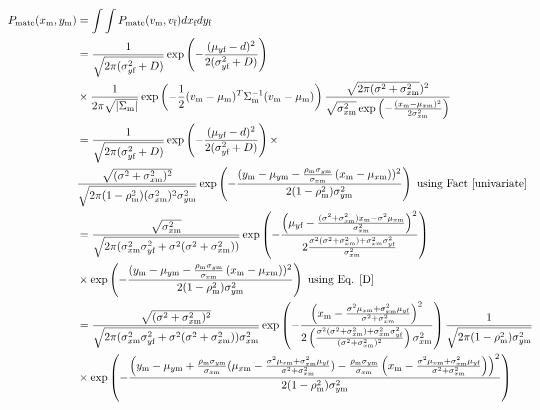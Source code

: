 \documentclass{article}
\newcommand{\x}[1]{\text{#1}}
\begin{document}
\begin{pf}
\begin{enumerate}
\begin{align*}
\hspace{-20pt}P_\text{mate}(x_\x{m},y_\x{m})&=\int\int P_\text{mate}(v_\x{m},v_\x{f})dx_\x{f}dy_\x{f}
\\&=\frac{1}{\sqrt{2\pi(\sigma_{y\x{f}}^2+D)}}\exp\left(-\frac{(\mu_{y\x{f}}-d)^2}{2(\sigma_{y\x{f}}^2+D)}\right) 
\\&\times \frac{1}{2\pi\sqrt{|\Sigma_\x{m}|}}\exp\left(-\frac{1}{2}(v_\x{m}-\mu_\x{m})^T\Sigma_\x{m}^{-1}(v_\x{m}-\mu_\x{m})\right)\frac{\sqrt{2\pi(\sigma^2+\sigma_{x\x{m}}^2})^2}{\sqrt{\sigma_{x\x{m}}^2}\exp\left(-\frac{(x_\x{m}-\mu_{x\x{m}})^2}{2\sigma_{x\x{m}}^2}\right)}
\\&=\frac{1}{\sqrt{2\pi(\sigma_{y\x{f}}^2+D)}}\exp\left(-\frac{(\mu_{y\x{f}}-d)^2}{2(\sigma_{y\x{f}}^2+D)}\right)\times
\\ &\frac{\sqrt{(\sigma^2+\sigma_{x\x{m}}^2)^2}}{\sqrt{2\pi (1-\rho_\x{m}^2)(\sigma_{x\x{m}}^2)^2\sigma_{y\x{m}}^2}}\exp\left(-\frac{(y_\x{m}-\mu_{y\x{m}}-\frac{\rho_\x{m}\sigma_{y\x{m}}}{\sigma_{x\x{m}}}\left(x_\x{m}-\mu_{x\x{m}}\right))^2}{2(1-\rho_\x{m}^2)\sigma_{y\x{m}}^2}\right) \text{ using Fact \ref{univariate}}
\\&=\frac{\sqrt{\sigma_{x\x{m}}^2}}{\sqrt{2\pi(\sigma_{x\x{m}}^2\sigma_{y\x{f}}^2+\sigma^2(\sigma^2+\sigma_{x\x{m}}^2))}}\exp\left(-\frac{\left(\mu_{y\x{f}}-\frac{(\sigma^2+\sigma_{x\x{m}}^2)x_\x{m}-\sigma^2\mu_{x\x{m}}}{\sigma_{x\x{m}}^2}\right)^2}{2\frac{\sigma^2(\sigma^2+\sigma_{x\x{m}}^2)+\sigma_{x\x{m}}^2\sigma_{y\x{f}}^2}{\sigma_{x\x{m}}^2}}\right)
\\&\times\exp\left(-\frac{(y_\x{m}-\mu_{y\x{m}}-\frac{\rho_\x{m}\sigma_{y\x{m}}}{\sigma_{x\x{m}}}\left(x_\x{m}-\mu_{x\x{m}}\right))^2}{2(1-\rho_\x{m}^2)\sigma_{y\x{m}}^2}\right) \text{ using Eq. \ref{D}}
\\&=\frac{\sqrt{(\sigma^2+\sigma_{x\x{m}}^2)^2}}{\sqrt{2\pi(\sigma_{x\x{m}}^2\sigma_{y\x{f}}^2+\sigma^2(\sigma^2+\sigma_{x\x{m}}^2))\sigma_{x\x{m}}^2}}\exp\left(-\frac{\left(x_\x{m}-\frac{\sigma^2\mu_{x\x{m}}+\sigma_{x\x{m}}^2\mu_{y\x{f}}}{\sigma^2+\sigma_{x\x{m}}^2}\right)^2}{2\left(\frac{\sigma^2(\sigma^2+\sigma_{x\x{m}}^2)+\sigma_{x\x{m}}^2\sigma_{y\x{f}}^2}{(\sigma^2+\sigma_{x\x{m}}^2)^2}\right)\sigma_{x\x{m}}^2}\right)\frac{1}{\sqrt{2\pi (1-\rho_\x{m}^2)\sigma_{y\x{m}}^2}}
\\&\times\exp\left(-\frac{\left(y_\x{m}-\mu_{y\x{m}}+\frac{\rho_\x{m}\sigma_{y\x{m}}}{\sigma_{x\x{m}}}(\mu_{x\x{m}}-\frac{\sigma^2\mu_{x\x{m}}+\sigma_{x\x{m}}^2\mu_{y\x{f}}}{\sigma^2+\sigma_{x\x{m}}^2})-\frac{\rho_\x{m}\sigma_{y\x{m}}}{\sigma_{x\x{m}}}\left(x_\x{m}-\frac{\sigma^2\mu_{x\x{m}}+\sigma_{x\x{m}}^2\mu_{y\x{f}}}{\sigma^2+\sigma_{x\x{m}}^2}\right)\right)^2}{2(1-\rho_\x{m}^2)\sigma_{y\x{m}}^2}\right)

\end{align*}
\end{enumerate}
\end{pf}
\end{document}
